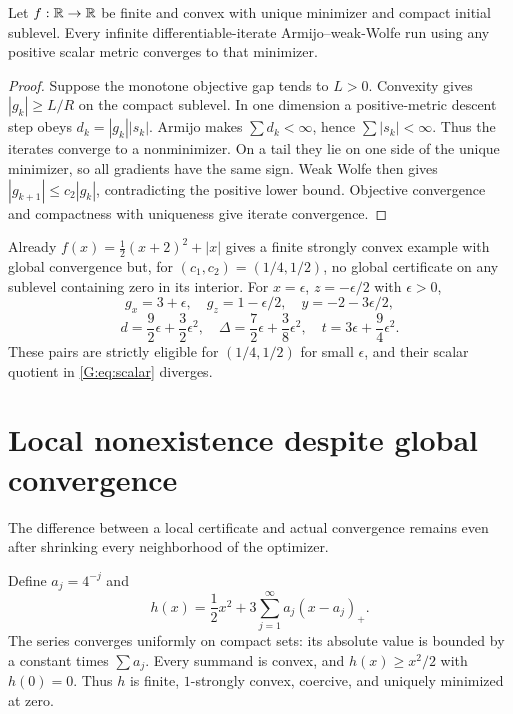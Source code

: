 \begin{proposition}\label{G:prop:scalarconv}
Let $f:\mathbb R\to\mathbb R$ be finite and convex with unique minimizer and compact initial sublevel. Every infinite differentiable-iterate Armijo--weak-Wolfe run using any positive scalar metric converges to that minimizer.
\end{proposition}
\begin{proof}
Suppose the monotone objective gap tends to $L>0$. Convexity gives $|g_k|\ge L/R$ on the compact sublevel. In one dimension a positive-metric descent step obeys $d_k=|g_k||s_k|$. Armijo makes $\sum d_k<\infty$, hence $\sum|s_k|<\infty$. Thus the iterates converge to a nonminimizer. On a tail they lie on one side of the unique minimizer, so all gradients have the same sign. Weak Wolfe then gives $|g_{k+1}|\le c_2|g_k|$, contradicting the positive lower bound. Objective convergence and compactness with uniqueness give iterate convergence.
\end{proof}
Already $f(x)=\frac12(x+2)^2+|x|$ gives a finite strongly convex example with global convergence but, for $(c_1,c_2)=(1/4,1/2)$, no global certificate on any sublevel containing zero in its interior. For $x=\epsilon$, $z=-\epsilon/2$ with $\epsilon>0$,
\[
 g_x=3+\epsilon,\quad g_z=1-\epsilon/2,\quad y=-2-3\epsilon/2,
\]
\[
 d=\frac92\epsilon+\frac32\epsilon^2,\quad
 \Delta=\frac72\epsilon+\frac38\epsilon^2,\quad
 t=3\epsilon+\frac94\epsilon^2.
\]
These pairs are strictly eligible for $(1/4,1/2)$ for small $\epsilon$, and their scalar quotient in \eqref{G:eq:scalar} diverges.


\setcounter{section}{6}
\setcounter{theorem}{0}
\setcounter{equation}{6}


\section{Local nonexistence despite global convergence}
The difference between a local certificate and actual convergence remains even after shrinking every neighborhood of the optimizer.

Define $a_j=4^{-j}$ and
\begin{equation}
 h(x)=\frac12x^2+3\sum_{j=1}^\infty a_j(x-a_j)_+. \label{G:eq:infinite}
\end{equation}
The series converges uniformly on compact sets: its absolute value is bounded by a constant times $\sum a_j$. Every summand is convex, and $h(x)\ge x^2/2$ with $h(0)=0$. Thus $h$ is finite, $1$-strongly convex, coercive, and uniquely minimized at zero.

